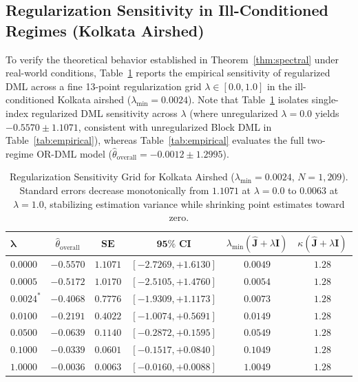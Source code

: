 \documentclass[twoside]{article}
\theoremstyle{definition}
\begin{document}
\subsection{Regularization Sensitivity in Ill-Conditioned Regimes (Kolkata Airshed)}
\label{app:kolkata_sensitivity}
To verify the theoretical behavior established in Theorem~\ref{thm:spectral} under real-world conditions, Table~\ref{tab:kolkata_lambda_grid} reports the empirical sensitivity of regularized DML across a fine 13-point regularization grid $\lambda \in [0.0, 1.0]$ in the ill-conditioned Kolkata airshed ($\lambda_{\min} = 0.0024$). Note that Table~\ref{tab:kolkata_lambda_grid} isolates single-index regularized DML sensitivity across $\lambda$ (where unregularized $\lambda=0.0$ yields $-0.5570 \pm 1.1071$, consistent with unregularized Block DML in Table~\ref{tab:empirical}), whereas Table~\ref{tab:empirical} evaluates the full two-regime OR-DML model ($\hat{\theta}_{\mathrm{overall}} = -0.0012 \pm 1.2995$).

\begin{table}[!ht]
\centering
\footnotesize
\renewcommand{\arraystretch}{0.75}
\caption{Regularization Sensitivity Grid for Kolkata Airshed ($\lambda_{\min} = 0.0024$, $N=1,209$). Standard errors decrease monotonically from $1.1071$ at $\lambda=0.0$ to $0.0063$ at $\lambda=1.0$, stabilizing estimation variance while shrinking point estimates toward zero.}
\label{tab:kolkata_lambda_grid}
\begin{tabular}{lccccc}
\toprule
$\boldsymbol{\lambda}$ & $\hat{\theta}_{\mathrm{overall}}$ & $\mathbf{SE}$ & $\mathbf{95\% \text{ CI}}$ & $\lambda_{\min}(\hat{\boldsymbol{J}}+\lambda\boldsymbol{I})$ & $\kappa(\hat{\boldsymbol{J}}+\lambda\boldsymbol{I})$ \\
\midrule
$0.0000$ & $-0.5570$ & $1.1071$ & $[-2.7269, +1.6130]$ & $0.0049$ & $1.28$ \\
$0.0005$ & $-0.5172$ & $1.0170$ & $[-2.5105, +1.4760]$ & $0.0054$ & $1.28$ \\
$0.0024^*$ & $-0.4068$ & $0.7776$ & $[-1.9309, +1.1173]$ & $0.0073$ & $1.28$ \\
$0.0100$ & $-0.2191$ & $0.4022$ & $[-1.0074, +0.5691]$ & $0.0149$ & $1.28$ \\
$0.0500$ & $-0.0639$ & $0.1140$ & $[-0.2872, +0.1595]$ & $0.0549$ & $1.28$ \\
$0.1000$ & $-0.0339$ & $0.0601$ & $[-0.1517, +0.0840]$ & $0.1049$ & $1.28$ \\
$1.0000$ & $-0.0036$ & $0.0063$ & $[-0.0160, +0.0088]$ & $1.0049$ & $1.28$ \\
\bottomrule
\end{tabular}
\end{table}
\end{document}
